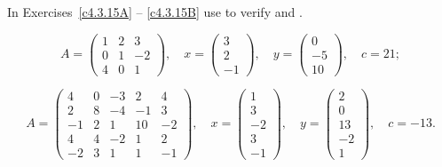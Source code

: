 \documentclass{ximera}
\begin{document}
\noindent In Exercises~\ref{c4.3.15A} -- \ref{c4.3.15B} use \Matlab to
verify  and .
\begin{exercise} \label{c4.3.15A}
\begin{equation*} \label{eq4.3.15a}
A = \left(
\begin{array}{rrr}
 1 & 2 & 3  \\
 0 & 1 & -2  \\
 4 & 0 & 1
\end{array}
\right),\quad
x=\left(
\begin{array}{r}
 3   \\
 2   \\
 -1
\end{array}
\right),\quad
y=\left(
\begin{array}{r}
 0   \\
 -5   \\
 10
\end{array}
\right),\quad c=21;
\end{equation*}
\end{exercise}
\begin{exercise} \label{c4.3.15B}
\begin{equation*} \label{eq4.3.15b}
A = \left(
\begin{array}{rrrrr}
 4 & 0 & -3 & 2 & 4 \\
 2 & 8 & -4 & -1 & 3 \\
 -1 & 2 & 1 & 10 & -2 \\
 4 & 4 & -2 & 1 & 2 \\
 -2 & 3 & 1 & 1 & -1
\end{array}
\right),\quad
x=\left(
\begin{array}{r}
 1   \\
 3   \\
 -2   \\
 3   \\
 -1
\end{array}
\right),\quad
y=\left(
\begin{array}{r}
 2   \\
 0   \\
 13   \\
 -2   \\
 1
\end{array}
\right),\quad c=-13.
\end{equation*}
\end{exercise}
\end{document}
